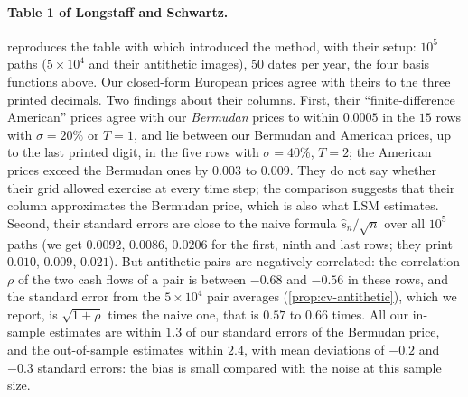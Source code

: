 \paragraph{Table 1 of Longstaff and Schwartz.}  reproduces the table with
which \textcite{longstaff-schwartz} introduced the method, with their setup: $10^5$ paths
($5\times10^4$ and their antithetic images), $50$ dates per year, the four basis functions
above. Our closed-form European prices agree with theirs to the three printed decimals. Two
findings about their columns. First, their ``finite-difference American'' prices agree with
our \emph{Bermudan} prices to within $0.0005$ in the $15$ rows with $\sigma=20\%$ or $T=1$,
and lie between our Bermudan and American prices, up to the last printed digit, in the five
rows with $\sigma=40\%$, $T=2$; the American prices exceed the Bermudan ones by $0.003$ to
$0.009$. They do not say whether their grid allowed exercise at every time step; the
comparison suggests that their column approximates the Bermudan price, which is also what
LSM estimates. Second, their standard errors are close to the naive formula $\hat s_n/\sqrt
n$ over all $10^5$ paths (we get $0.0092$, $0.0086$, $0.0206$ for the first, ninth and last
rows; they print $0.010$, $0.009$, $0.021$). But antithetic pairs are negatively correlated:
the correlation $\rho$ of the two cash flows of a pair is between $-0.68$ and $-0.56$ in these
rows, and the standard error from the $5\times10^4$ pair averages
(\cref{prop:cv-antithetic}), which we report, is $\sqrt{1+\rho}$ times the naive one, that
is $0.57$ to $0.66$ times. All our in-sample estimates are within $1.3$
of our standard errors of the Bermudan price, and the out-of-sample estimates within $2.4$,
with mean deviations of $-0.2$ and $-0.3$ standard errors: the bias is small compared with
the noise at this sample size.

